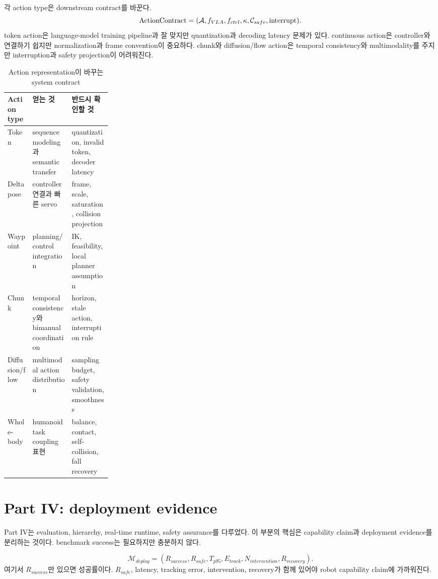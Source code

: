 각 action type은 downstream contract를 바꾼다.
\begin{equation}
  \mathrm{ActionContract}
  =
  (
  \mathcal{A},
  f_{VLA},
  f_{ctrl},
  \kappa,
  \mathcal{C}_{safe},
  \mathrm{interrupt}
  ).
  \label{eq:ch21-action-contract-review}
\end{equation}
token action은 language-model training pipeline과 잘 맞지만 quantization과 decoding latency 문제가 있다. continuous action은 controller와 연결하기 쉽지만 normalization과 frame convention이 중요하다. chunk와 diffusion/flow action은 temporal consistency와 multimodality를 주지만 interruption과 safety projection이 어려워진다.

\begin{table}[h]
  \centering
  \caption{Action representation이 바꾸는 system contract}
  \begin{tabularx}{\linewidth}{p{0.24\linewidth}X X}
    \toprule
    Action type & 얻는 것 & 반드시 확인할 것 \\
    \midrule
    Token & sequence modeling과 semantic transfer & quantization, invalid token, decoder latency \\
    Delta pose & controller 연결과 빠른 servo & frame, scale, saturation, collision projection \\
    Waypoint & planning/control integration & IK, feasibility, local planner assumption \\
    Chunk & temporal consistency와 bimanual coordination & horizon, stale action, interruption rule \\
    Diffusion/flow & multimodal action distribution & sampling budget, safety validation, smoothness \\
    Whole-body & humanoid task coupling 표현 & balance, contact, self-collision, fall recovery \\
    \bottomrule
  \end{tabularx}
  \label{tab:ch21-action-contract-summary}
\end{table}

\section{Part IV: deployment evidence}

Part IV는 evaluation, hierarchy, real-time runtime, safety assurance를 다루었다. 이 부분의 핵심은 capability claim과 deployment evidence를 분리하는 것이다. benchmark success는 필요하지만 충분하지 않다.

\begin{equation}
  \mathcal{M}_{deploy}
  =
  (
  R_{success},
  R_{safe},
  T_{p95},
  E_{track},
  N_{intervention},
  R_{recovery}
  ).
  \label{eq:ch21-deploy-metrics}
\end{equation}
여기서 $R_{success}$만 있으면 성공률이다. $R_{safe}$, latency, tracking error, intervention, recovery가 함께 있어야 robot capability claim에 가까워진다.

